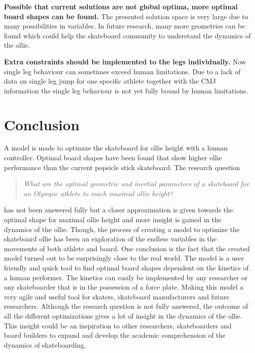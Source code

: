 \documentclass[default,iicol]{sn-jnl}
\begin{document}
{\noindent\textbf{Possible that current solutions are not global optima, more optimal board shapes can be found.} The presented solution space is very large due to many possibilities in variables. In future research, many more geometries can be found which could help the skateboard community to understand the dynamics of the ollie. 

\noindent\textbf{Extra constraints should be implemented to the legs individually.} Now single leg behaviour can sometimes exceed human limitations. Due to a lack of data on single leg jump for one specific athlete together with the CMJ information the single leg behaviour is not yet fully bound by human limitations.

\section{Conclusion}
\noindent A model is made to optimize the skateboard for ollie height with a human controller. Optimal board shapes have been found that show higher ollie performance than the current popsicle stick skateboard. The research question 
\begin{quote}
\textit{What are the optimal geometric and inertial parameters of a skateboard for an Olympic athlete to reach maximal ollie height? 
}\end{quote}
has not been answered fully but a closer approximation is given towards the optimal shape for maximal ollie height and more insight is gained in the dynamics of the ollie. Though, the process of creating a model to optimize the skateboard ollie has been an exploration of the endless variables in the movements of both athlete and board. One conclusion is the fact that the created model turned out to be surprisingly close to the real world. The model is a user friendly and quick tool to find optimal board shapes dependent on the kinetics of a human performer. The kinetics can easily be implemented by any researcher or any skateboarder that is in the possession of a force plate. Making this model a very agile and useful tool for skaters, skateboard manufacturers and future researchers. Although the research question is not fully answered, the outcome of all the different optimizations gives a lot of insight in the dynamics of the ollie. This insight could be an inspiration to other researchers, skateboarders and board builders to expand and develop the academic comprehension of the dynamics of skateboarding. 




}
\end{document}
